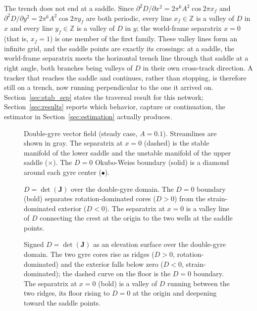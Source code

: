 \documentclass[12pt, letterpaper, oneside]{report}
\begin{document}
The trench does not end at a saddle. Since
$\partial^2D/\partial x^2=2\pi^6A^2\cos2\pi x_f$ and
$\partial^2D/\partial y^2=2\pi^6A^2\cos2\pi y_f$ are both periodic, every
line $x_f\in\mathbb{Z}$ is a valley of $D$ in $x$ and every line
$y_f\in\mathbb{Z}$ is a valley of $D$ in $y$; the world-frame separatrix
$x=0$ (that is, $x_f=1$) is one member of the first family. These valley
lines form an infinite grid, and the saddle points are exactly its
crossings: at a saddle, the world-frame separatrix meets the horizontal
trench line through that saddle at a right angle, both branches being
valleys of $D$ in their own cross-track direction. A tracker that reaches
the saddle and continues, rather than stopping, is therefore still on a
trench, now running perpendicular to the one it arrived on.
Section~\ref{sec:stab_sep} states the traversal result for this network;
Section~\ref{sec:results} reports which behavior, capture or continuation,
the estimator in Section~\ref{sec:estimation} actually produces.

\begin{figure}[!t]
\centering
\framebox[0.9\linewidth]{\rule{0pt}{3.0cm}}
\caption{Double-gyre vector field (steady case, $A=0.1$). Streamlines are
shown in gray. The separatrix at $x=0$ (dashed) is the stable manifold of
the lower saddle and the unstable manifold of the upper saddle ($\times$).
The $D=0$ Okubo-Weiss boundary (solid) is a diamond around each gyre
center ($\bullet$).}
\label{fig:dg_streamlines}
\end{figure}

\begin{figure}[!t]
\centering
\framebox[0.9\linewidth]{\rule{0pt}{3.0cm}}
\caption{$D=\det(\mathbf{J})$ over the double-gyre domain. The $D=0$
boundary (bold) separates rotation-dominated cores ($D>0$) from the
strain-dominated exterior ($D<0$). The separatrix at $x=0$ is a valley
line of $D$ connecting the crest at the origin to the two wells at the
saddle points.}
\label{fig:detJ_contour}
\end{figure}

\begin{figure}[!t]
\centering
\framebox[0.9\linewidth]{\rule{0pt}{3.0cm}}
\caption{Signed $D=\det(\mathbf{J})$ as an elevation surface over the
double-gyre domain. The two gyre cores rise as ridges ($D>0$,
rotation-dominated) and the exterior falls below zero ($D<0$,
strain-dominated); the dashed curve on the floor is the $D=0$ boundary.
The separatrix at $x=0$ (bold) is a valley of $D$ running between the two
ridges, its floor rising to $D=0$ at the origin and deepening toward the
saddle points.}
\label{fig:trench_cross}
\end{figure}
\end{document}
